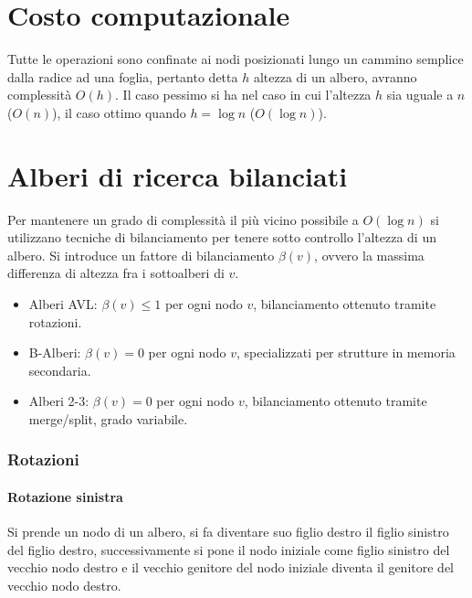 \section{Costo computazionale}
Tutte le operazioni sono confinate ai nodi posizionati lungo un cammino semplice dalla radice ad una foglia, pertanto detta $h$ altezza di un albero, 
avranno complessit\`a $O(h)$. Il caso pessimo si ha nel caso in cui l'altezza $h$ sia uguale a $n$ ($O(n)$), il caso ottimo quando $h=\log n$ ($O(\log n)$).
\section{Alberi di ricerca bilanciati}
Per mantenere un grado di complessit\`a il pi\`u vicino possibile a $O(\log n)$ si utilizzano tecniche di bilanciamento per tenere sotto controllo l'altezza
di un albero. Si introduce un fattore di bilanciamento $\beta(v)$, ovvero la massima differenza di altezza fra i sottoalberi di $v$. 
\begin{itemize}
\item Alberi AVL: $\beta(v)\le 1$ per ogni nodo $v$, bilanciamento ottenuto tramite rotazioni.
\item B-Alberi: $\beta(v)=0$ per ogni nodo $v$, specializzati per strutture in memoria secondaria.
\item Alberi 2-3: $\beta(v)=0$ per ogni nodo $v$, bilanciamento ottenuto tramite merge/split, grado variabile.
\end{itemize}
\subsubsection{Rotazioni} 
\paragraph{Rotazione sinistra}
Si prende un nodo di un albero, si fa diventare suo figlio destro il figlio sinistro del figlio destro, successivamente si pone il nodo iniziale come figlio 
sinistro del vecchio nodo destro e il vecchio genitore del nodo iniziale diventa il genitore del vecchio nodo destro.
